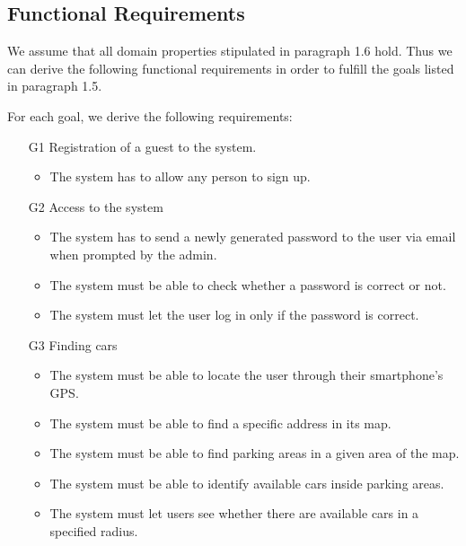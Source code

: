 
\subsection{Functional Requirements}
We assume that all domain properties stipulated in paragraph 1.6 hold. Thus we can derive the following functional requirements in order to fulfill the goals listed in paragraph 1.5.

For each goal, we derive the following requirements:

\begin{itemize}
	\item [G1] Registration of a guest to the system.%
		\begin{itemize}
			\item The system has to allow any person to sign up. %
		\end{itemize}
	\item [G2] Access to the system %
		\begin{itemize}
			\item The system has to send a newly generated password to the user via email when prompted by the admin.
			\item The system must be able to check whether a password is correct or not.
			\item The system must let the user log in only if the password is correct. 
		\end{itemize}
	\item [G3] Finding cars %
		\begin{itemize}
			\item The system must be able to locate the user through their smartphone's GPS.
			\item The system must be able to find a specific address in its map. %
			\item The system must be able to find parking areas in a given area of the map. 
			\item The system must be able to identify available cars inside parking areas.
			\item The system must let users see whether there are available cars in a specified radius. 

\end{itemize}
\end{itemize}
